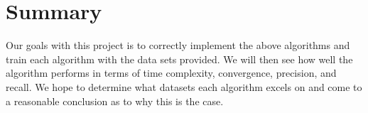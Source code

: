 \documentclass{article}
\begin{document}
	\section{Summary}
	Our goals with this project is to correctly implement the above algorithms and train each algorithm with the data sets provided. We will then see how well the algorithm performs in terms of time complexity, convergence, precision, and recall. We hope to determine what datasets each algorithm excels on and come to a reasonable conclusion as to why this is the case.

		
	
\end{document}
